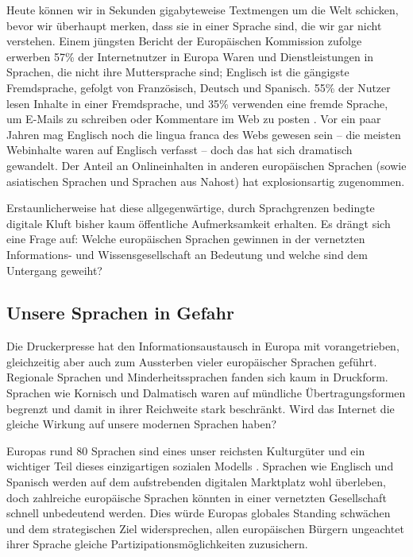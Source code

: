 \documentclass[]{../../metanetpaper}
\begin{document}
\begin{multicols}{2}
Heute können wir in Sekunden gigabyteweise Textmengen um die Welt schicken, bevor wir überhaupt merken, dass sie in einer Sprache sind, die wir gar nicht verstehen. Einem jüngsten Bericht der Europäischen Kommission zufolge erwerben 57\% der Internetnutzer in Europa Waren und Dienstleistungen in Sprachen, die nicht ihre Muttersprache sind; Englisch ist die gängigste Fremdsprache, gefolgt von Französisch, Deutsch und Spanisch. 55\% der Nutzer lesen Inhalte in einer Fremdsprache, und 35\% verwenden eine fremde Sprache, um E-Mails zu schreiben oder Kommentare im Web zu posten \cite{EC1}. Vor ein paar Jahren mag Englisch noch die lingua franca des Webs gewesen sein -- die meisten Webinhalte waren auf Englisch verfasst -- doch das hat sich dramatisch gewandelt. Der Anteil an Onlineinhalten in anderen europäischen Sprachen (sowie asiatischen Sprachen und Sprachen aus Nahost) hat explosionsartig zugenommen. 

Erstaunlicherweise hat diese allgegenwärtige, durch Sprachgrenzen bedingte digitale Kluft bisher kaum öffentliche Aufmerksamkeit erhalten.  Es drängt sich eine Frage auf: Welche europäischen Sprachen gewinnen in der vernetzten Informations- und Wissensgesellschaft an Bedeutung und welche sind dem Untergang geweiht?

\subsection{Unsere Sprachen in Gefahr}

Die Druckerpresse hat den Informationsaustausch in Europa mit vorangetrieben, gleichzeitig aber auch zum Aussterben vieler europäischer Sprachen geführt. Regionale Sprachen und Minderheitssprachen fanden sich kaum in Druckform. Sprachen wie Kornisch und Dalmatisch waren auf mündliche Übertragungsformen begrenzt und damit in ihrer Reichweite stark beschränkt. Wird das Internet die gleiche Wirkung auf unsere modernen Sprachen haben?

Europas rund 80 Sprachen sind eines unser reichsten Kulturgüter und ein wichtiger Teil dieses einzigartigen sozialen Modells \cite{EC2}. Sprachen wie Englisch und Spanisch werden auf dem aufstrebenden digitalen Marktplatz wohl überleben, doch zahlreiche europäische Sprachen könnten in einer vernetzten Gesellschaft schnell unbedeutend werden. Dies würde Europas globales Standing schwächen und dem strategischen Ziel widersprechen, allen europäischen Bürgern ungeachtet ihrer Sprache gleiche Partizipationsmöglichkeiten zuzusichern.


\end{multicols}
\end{document}
